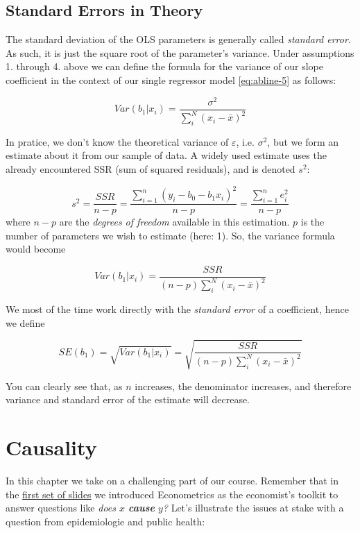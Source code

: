 \documentclass[]{book}
\begin{document}
\section{Standard Errors in Theory}\label{se-theory}

The standard deviation of the OLS parameters is generally called
\emph{standard error}. As such, it is just the square root of the
parameter's variance. Under assumptions 1. through 4. above we can
define the formula for the variance of our slope coefficient in the
context of our single regressor model \eqref{eq:abline-5} as follows:

\begin{equation}
Var(b_1|x_i) = \frac{\sigma^2}{\sum_i^N (x_i - \bar{x})^2}  \label{eq:var-ols}
\end{equation}

In pratice, we don't know the theoretical variance of \(\varepsilon\),
i.e. \(\sigma^2\), but we form an estimate about it from our sample of
data. A widely used estimate uses the already encountered SSR (sum of
squared residuals), and is denoted \(s^2\):

\[
s^2 = \frac{SSR}{n-p} = \frac{\sum_{i=1}^n (y_i - b_0 - b_1 x_i)^2}{n-p} =  \frac{\sum_{i=1}^n e_i^2}{n-p}
\] where \(n-p\) are the \emph{degrees of freedom} available in this
estimation. \(p\) is the number of parameters we wish to estimate (here:
1). So, the variance formula would become

\begin{equation}
Var(b_1|x_i) = \frac{SSR}{(n-p)\sum_i^N (x_i - \bar{x})^2}  \label{eq:var-ols2}
\end{equation}

We most of the time work directly with the \emph{standard error} of a
coefficient, hence we define

\begin{equation}
SE(b_1) = \sqrt{Var(b_1|x_i)} = \sqrt{\frac{SSR}{(n-p)\sum_i^N (x_i - \bar{x})^2}}  \label{eq:SE-ols2}
\end{equation}

You can clearly see that, as \(n\) increases, the denominator increases,
and therefore variance and standard error of the estimate will decrease.

\chapter{Causality}\label{causality}

In this chapter we take on a challenging part of our course. Remember
that in the
\href{https://rawcdn.githack.com/ScPoEcon/ScPoEconometrics-Slides/session2_1/chapter1/chapter1.html}{first
set of slides} we introduced Econometrics as the economist's toolkit to
answer questions like \emph{does \(x\) \textbf{cause} \(y\)?} Let's
illustrate the issues at stake with a question from epidemiologie and
public health:
\end{document}
